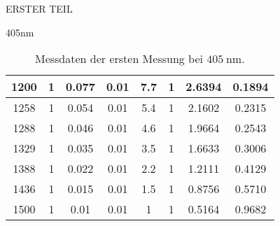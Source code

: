 \begin{appendix}
\begin{chapter}{ERSTER TEIL}
\begin{section}{405nm}
\begin{table}[htbp]
\begin{tabular}{|c|c|c|c|c|c|c|c|}
            1200 & 1 & 0.077 & 0.01 & 7.7 & 1 & 2.6394 & 0.1894 \\ \hline
            1258 & 1 & 0.054 & 0.01 & 5.4 & 1 & 2.1602 & 0.2315 \\ \hline
            1288 & 1 & 0.046 & 0.01 & 4.6 & 1 & 1.9664 & 0.2543 \\ \hline
            1329 & 1 & 0.035 & 0.01 & 3.5 & 1 & 1.6633 & 0.3006 \\ \hline
            1388 & 1 & 0.022 & 0.01 & 2.2 & 1 & 1.2111 & 0.4129 \\ \hline
            1436 & 1 & 0.015 & 0.01 & 1.5 & 1 & 0.8756 & 0.5710 \\ \hline
            1500 & 1 & 0.01 & 0.01 & 1 & 1 & 0.5164 & 0.9682 \\ \hline
          \end{tabular}
          \caption{Messdaten der ersten Messung bei $\SI{405}{\nano\meter}$.}
          \label{tab:405_1}
        \end{table}
        

\end{section}
\end{chapter}
\end{appendix}
